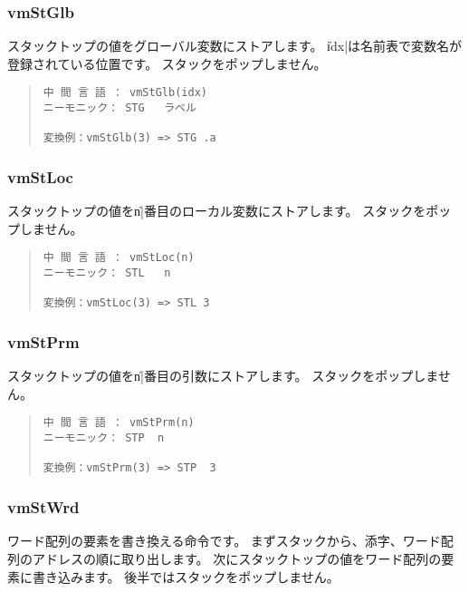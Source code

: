 \subsubsection{vmStGlb}

スタックトップの値をグローバル変数にストアします。
\|idx|は名前表で変数名が登録されている位置です。
スタックをポップしません。

\begin{quote}
\begin{verbatim}
中 間 言 語 ： vmStGlb(idx)
ニーモニック： STG   ラベル

変換例：vmStGlb(3) => STG .a
\end{verbatim}
\end{quote}

\subsubsection{vmStLoc}

スタックトップの値を\|n|番目のローカル変数にストアします。
スタックをポップしません。

\begin{quote}
\begin{verbatim}
中 間 言 語 ： vmStLoc(n)
ニーモニック： STL   n

変換例：vmStLoc(3) => STL 3
\end{verbatim}
\end{quote}

\subsubsection{vmStPrm}

スタックトップの値を\|n|番目の引数にストアします。
スタックをポップしません。

\begin{quote}
\begin{verbatim}
中 間 言 語 ： vmStPrm(n)
ニーモニック： STP  n   

変換例：vmStPrm(3) => STP  3
\end{verbatim}
\end{quote}

\subsubsection{vmStWrd}

ワード配列の要素を書き換える命令です。
まずスタックから、添字、ワード配列のアドレスの順に取り出します。
次にスタックトップの値をワード配列の要素に書き込みます。
後半ではスタックをポップしません。


